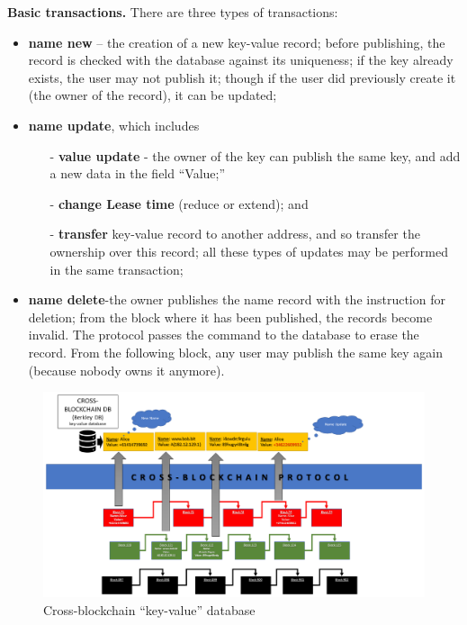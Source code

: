 \begin{multicols}{2}
\textbf{Basic transactions.} There are three types of transactions: 

\begin{itemize}
\item \textbf{name new} – the creation of a new key-value record; before publishing, the record is checked with the database against its uniqueness; if the key already exists, the user may not publish it; though if the user did previously create it (the owner of the record), it can be updated;
\item \textbf{name update}, which includes
\begin{itemize}
\item[-] \textbf{value update} - the owner of the key can publish the same key, and add a new data in the field “Value;”
\item[-] \textbf{change Lease time} (reduce or extend); and 
\item[-] \textbf{transfer} key-value record to another address, and so transfer the ownership over this record; all these types of updates may be performed in the same transaction;
\end{itemize}
\item \textbf{name delete}-the owner publishes the name record with the instruction for deletion; from the block where it has been published, the records become invalid. The protocol passes the command to the database to erase the record. From the following block, any user may publish the same key again (because nobody owns it anymore).
\end{itemize}
\end{multicols}

\vspace{-.5cm}

\begin{figure}[H]
\centering
\includegraphics[scale=1.65]{src/Figures/chap1/chap1-fig03.jpg}
\caption{Cross-blockchain “key-value” database}\label{chap1-fig03}
\end{figure}

